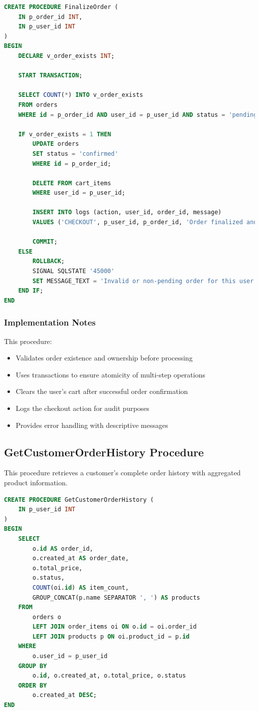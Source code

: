 \documentclass[13pt,a4paper]{article}
\begin{document}
\begin{lstlisting}[language=SQL]
CREATE PROCEDURE FinalizeOrder (
    IN p_order_id INT,
    IN p_user_id INT
)
BEGIN
    DECLARE v_order_exists INT;

    START TRANSACTION;

    SELECT COUNT(*) INTO v_order_exists
    FROM orders
    WHERE id = p_order_id AND user_id = p_user_id AND status = 'pending';

    IF v_order_exists = 1 THEN
        UPDATE orders
        SET status = 'confirmed'
        WHERE id = p_order_id;

        DELETE FROM cart_items
        WHERE user_id = p_user_id;

        INSERT INTO logs (action, user_id, order_id, message)
        VALUES ('CHECKOUT', p_user_id, p_order_id, 'Order finalized and cart emptied');

        COMMIT;
    ELSE
        ROLLBACK;
        SIGNAL SQLSTATE '45000'
        SET MESSAGE_TEXT = 'Invalid or non-pending order for this user';
    END IF;
END
\end{lstlisting}

\subsubsection{Implementation Notes}
This procedure:
\begin{itemize}
	\item Validates order existence and ownership before processing
	\item Uses transactions to ensure atomicity of multi-step operations
	\item Clears the user's cart after successful order confirmation
	\item Logs the checkout action for audit purposes
	\item Provides error handling with descriptive messages
\end{itemize}

\subsection{GetCustomerOrderHistory Procedure}
This procedure retrieves a customer's complete order history with aggregated product information.

\begin{lstlisting}[language=SQL]
CREATE PROCEDURE GetCustomerOrderHistory (
    IN p_user_id INT
)
BEGIN
    SELECT
        o.id AS order_id,
        o.created_at AS order_date,
        o.total_price,
        o.status,
        COUNT(oi.id) AS item_count,
        GROUP_CONCAT(p.name SEPARATOR ', ') AS products
    FROM
        orders o
        LEFT JOIN order_items oi ON o.id = oi.order_id
        LEFT JOIN products p ON oi.product_id = p.id
    WHERE
        o.user_id = p_user_id
    GROUP BY
        o.id, o.created_at, o.total_price, o.status
    ORDER BY
        o.created_at DESC;
END
\end{lstlisting}
\end{document}
